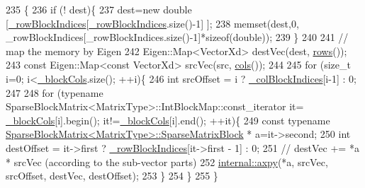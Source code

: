 \begin{DoxyCode}
235                                                                                      \{
236     \textcolor{keywordflow}{if} (! dest)\{
237       dest=\textcolor{keyword}{new} \textcolor{keywordtype}{double} [\hyperlink{classg2o_1_1SparseBlockMatrix_ab0bd9c6d5b7b8704af1bc679032382e3}{\_rowBlockIndices}[\hyperlink{classg2o_1_1SparseBlockMatrix_ab0bd9c6d5b7b8704af1bc679032382e3}{\_rowBlockIndices}.size()-1] ];
238       memset(dest,0, \_rowBlockIndices[\_rowBlockIndices.size()-1]*\textcolor{keyword}{sizeof}(double));
239     \}
240 
241     \textcolor{comment}{// map the memory by Eigen}
242     Eigen::Map<VectorXd> destVec(dest, \hyperlink{classg2o_1_1SparseBlockMatrix_adf18fb267e545b9036314cf9f8f10473}{rows}());
243     \textcolor{keyword}{const} Eigen::Map<const VectorXd> srcVec(src, \hyperlink{classg2o_1_1SparseBlockMatrix_ab854ca59f370d93229852e32a7b49d3e}{cols}());
244 
245     \textcolor{keywordflow}{for} (\textcolor{keywordtype}{size\_t} i=0; i<\hyperlink{classg2o_1_1SparseBlockMatrix_ae236d56a01ba4d292450a518621b41f8}{\_blockCols}.size(); ++i)\{
246       \textcolor{keywordtype}{int} srcOffset = i ? \hyperlink{classg2o_1_1SparseBlockMatrix_aca008740c37d2d00b90f696ab19abb59}{\_colBlockIndices}[i-1] : 0;
247 
248       \textcolor{keywordflow}{for} (\textcolor{keyword}{typename} SparseBlockMatrix<MatrixType>::IntBlockMap::const\_iterator it=
      \hyperlink{classg2o_1_1SparseBlockMatrix_ae236d56a01ba4d292450a518621b41f8}{\_blockCols}[i].begin(); it!=\hyperlink{classg2o_1_1SparseBlockMatrix_ae236d56a01ba4d292450a518621b41f8}{\_blockCols}[i].end(); ++it)\{
249         \textcolor{keyword}{const} \textcolor{keyword}{typename} \hyperlink{classg2o_1_1SparseBlockMatrix_ab2f7376cbf055803fda6527dcc43e3be}{SparseBlockMatrix<MatrixType>::SparseMatrixBlock}
      * a=it->second;
250         \textcolor{keywordtype}{int} destOffset = it->first ? \hyperlink{classg2o_1_1SparseBlockMatrix_ab0bd9c6d5b7b8704af1bc679032382e3}{\_rowBlockIndices}[it->first - 1] : 0;
251         \textcolor{comment}{// destVec += *a * srcVec (according to the sub-vector parts)}
252         \hyperlink{namespaceg2o_1_1internal_a3beb413c2d04c629c60a8ce5e05ddf8f}{internal::axpy}(*a, srcVec, srcOffset, destVec, destOffset);
253       \}
254     \}
255   \}
\end{DoxyCode}
